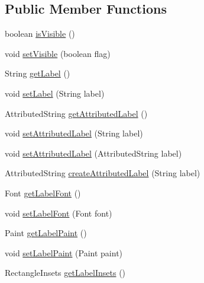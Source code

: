 \subsection*{Public Member Functions}
\begin{DoxyCompactItemize}
\item 
boolean \mbox{\hyperlink{classorg_1_1jfree_1_1chart_1_1axis_1_1_axis_ab40987e53712a299b588e23effa22f90}{is\+Visible}} ()
\item 
void \mbox{\hyperlink{classorg_1_1jfree_1_1chart_1_1axis_1_1_axis_aa76bd373dd5f03f842bbef81e65c2eba}{set\+Visible}} (boolean flag)
\item 
String \mbox{\hyperlink{classorg_1_1jfree_1_1chart_1_1axis_1_1_axis_ab3cbe2900ef95b51b4036f7b753e3c41}{get\+Label}} ()
\item 
void \mbox{\hyperlink{classorg_1_1jfree_1_1chart_1_1axis_1_1_axis_a645aa69b1907aa460a92e08a126c6d79}{set\+Label}} (String label)
\item 
Attributed\+String \mbox{\hyperlink{classorg_1_1jfree_1_1chart_1_1axis_1_1_axis_a9edf528ad7712a2f53213f51054ea13c}{get\+Attributed\+Label}} ()
\item 
void \mbox{\hyperlink{classorg_1_1jfree_1_1chart_1_1axis_1_1_axis_adc41b47c710d5eeb1238adb41e8453b0}{set\+Attributed\+Label}} (String label)
\item 
void \mbox{\hyperlink{classorg_1_1jfree_1_1chart_1_1axis_1_1_axis_a3272f88a20bcabda89b03298f0336fb5}{set\+Attributed\+Label}} (Attributed\+String label)
\item 
Attributed\+String \mbox{\hyperlink{classorg_1_1jfree_1_1chart_1_1axis_1_1_axis_a7e32058f9e566c4ed0e9a245acd5c738}{create\+Attributed\+Label}} (String label)
\item 
Font \mbox{\hyperlink{classorg_1_1jfree_1_1chart_1_1axis_1_1_axis_a8aa271547c74cba1a28e26068828ef0e}{get\+Label\+Font}} ()
\item 
void \mbox{\hyperlink{classorg_1_1jfree_1_1chart_1_1axis_1_1_axis_a9fe56f9cd8d81dc5a0b96b70ab0c8643}{set\+Label\+Font}} (Font font)
\item 
Paint \mbox{\hyperlink{classorg_1_1jfree_1_1chart_1_1axis_1_1_axis_a81988e297d1403bfb05c2d0ba038cac5}{get\+Label\+Paint}} ()
\item 
void \mbox{\hyperlink{classorg_1_1jfree_1_1chart_1_1axis_1_1_axis_a68eeb531bf1f73ff8b0d4aa12ed54a1a}{set\+Label\+Paint}} (Paint paint)
\item 
Rectangle\+Insets \mbox{\hyperlink{classorg_1_1jfree_1_1chart_1_1axis_1_1_axis_a8b74d954f3fe5c0cd36ce38399cccd98}{get\+Label\+Insets}} ()

\end{DoxyCompactItemize}
